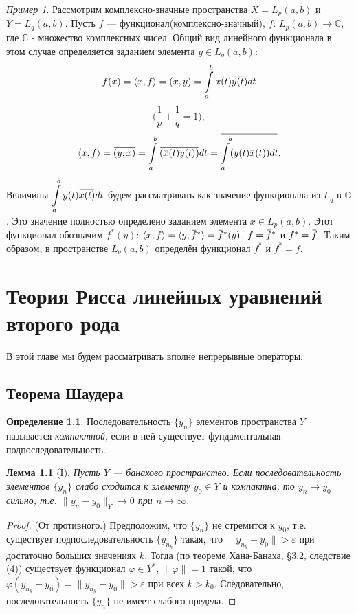 \documentclass[12pt,a4paper,titlepage,oneside]{book}
\newcommand{\overbar}[1]{\mkern 1.5mu\overline{\mkern-1.5mu#1\mkern-1.5mu}\mkern 1.5mu}
\theoremstyle{definition}
\newtheorem*{definition}{Определение}
\theoremstyle{plain}
\theoremstyle{break}
\theoremstyle{remark}
\theoremstyle{remark}
\newtheorem*{example}{Пример}
\theoremstyle{remark}
\theoremstyle{remark}
\theoremstyle{plain}
\newtheorem*{lemma}{Лемма}
\theoremstyle{plain}
\begin{document}
\begin{example}
Рассмотрим комплексно-значные пространства $X=L_p(a,b)$ и $Y=L_q(a,b)$. Пусть $f$ --- функционал(комплексно-значный), $f$: $L_p(a,b) \to \mathbb{C}$, где $\mathbb{C}$ - множество комплексных чисел. Общий вид линейного функционала в этом случае определяется заданием элемента $y \in L_q(a,b)$:
$$f(x) = \langle x, f \rangle = (x,y) = \displaystyle\int\limits_a^b x(t)\overbar{y(t)}dt$$
$$\Big( \frac{1}{p} + \frac{1}{q} = 1 \Big),$$
$$ \langle x, f \rangle  = \overbar{(y,x)}  = \displaystyle\int\limits_a^b \overbar{(\overbar{x}(t)y(t))} dt = \overbar{\displaystyle\int\limits_a^{-b} (y(t)\overbar{x}(t))dt}.$$
Величины $\displaystyle\int\limits_a^b y(t)\overbar{x(t)} dt$ будем рассматривать как значение функционала из $L_q$ в $\mathbb{C}$. Это значение полностью определено заданием элемента $x \in L_p(a,b)$. Этот функционал обозначим $f^{*}(y)$:
$\langle x,f \rangle = \langle y,\overbar{f}^{*} \rangle = \overbar{f}^{*}(y)$, $f=\overbar{f}^{*}$ и $f^{*}=\overbar{f}$.
Таким образом, в пространстве $L_q(a,b)$ определён функционал $f^{*}$ и $f^{*}=f$.
\end{example}

\chapter{Теория Рисса линейных уравнений второго рода}

В этой главе мы будем рассматривать вполне непрерывные операторы.

\section{Теорема Шаудера}

\begin{definition}
Последовательность $\{y_n\}$ элементов пространства $Y$ называется \textit{компактной}, если в ней существует фундаментальная подпоследовательность.
\end{definition}

\begin{lemma}[I]
Пусть $Y$ --- банахово пространство. Если последовательность элементов $\{y_n\}$ слабо сходится к элементу $y_0 \in Y$ и компактна, то $y_n\to y_0$ сильно, т.е. \mbox{$\lVert y_n - y_0\rVert_Y\to 0$} при $n\to\infty$.
\end{lemma}

\begin{proof}
(От противного.) Предположим, что $\{y_n\}$ не стремится к $y_0$, т.е. существует подпоследовательность $\{y_{n_k}\}$ такая, что $\lVert  y_{n_k} - y_0 \rVert > \varepsilon$ при достаточно больших значениях $k$. Тогда (по теореме Хана-Банаха, \S 3.2, следствие (4)) существует функционал $\varphi\in Y^*$, $\lVert\varphi\rVert=1$ такой, что $\varphi(y_{n_k} - y_0) = \lVert y_{n_k} - y_0 \rVert > \varepsilon$ при всех $k > k_0$. Следовательно, последовательность $\{y_n\}$ не имеет слабого предела.
\end{proof}
\end{document}
